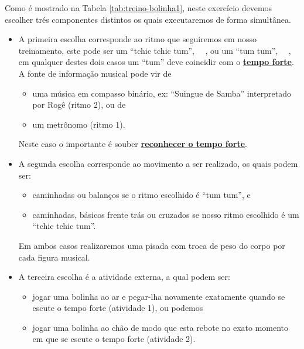 \begin{example}
\label{ex:treino-cognitivo-multi-simples}
Como é mostrado na Tabela \ref{tab:treino-bolinha1}, 
neste exercício devemos escolher trés componentes distintos os quais executaremos de forma simultânea.
\begin{itemize}
\item A primeira escolha corresponde ao ritmo que seguiremos em nosso treinamento, 
este pode ser 
um ``tchic tchic tum'', \leftrepeat~\Vier\Acht\Acht~\rightrepeat, ou 
um ``tum tum'', \leftrepeat~\Vier\Vier~\rightrepeat, 
em qualquer destes dois casos um ``tum'' deve coincidir com o \hyperref[subsec:perceberTF1]{\textbf{tempo forte}}.
A fonte de informação musical pode vir de
    \begin{itemize}
    \item uma música em compasso binário, ex: ``Suingue de Samba'' interpretado por Rogê (ritmo 2), ou de 
    \item um metrônomo (ritmo 1).
    \end{itemize}
Neste caso o importante é souber \hyperref[subsec:perceberTF1]{\textbf{reconhecer o tempo forte}}.
\item A segunda escolha corresponde ao movimento a ser realizado, os quais podem ser:
    \begin{itemize}
    \item caminhadas ou balanços se o ritmo escolhido é ``tum tum'', e
    \item caminhadas, básicos frente trás ou cruzados se nosso ritmo escolhido é um ``tchic tchic tum''.
    \end{itemize}
Em ambos casos realizaremos uma pisada com troca de peso do corpo por cada figura musical.
\item A terceira escolha é a atividade externa, a qual podem ser: 
    \begin{itemize}
    \item jogar uma bolinha ao ar e pegar-lha novamente exatamente quando se escute o tempo forte (atividade 1), ou podemos 
    \item jogar uma bolinha ao chão de modo que esta rebote no exato momento em que se escute o tempo forte (atividade 2).
    \end{itemize}
\end{itemize}
\end{example}

